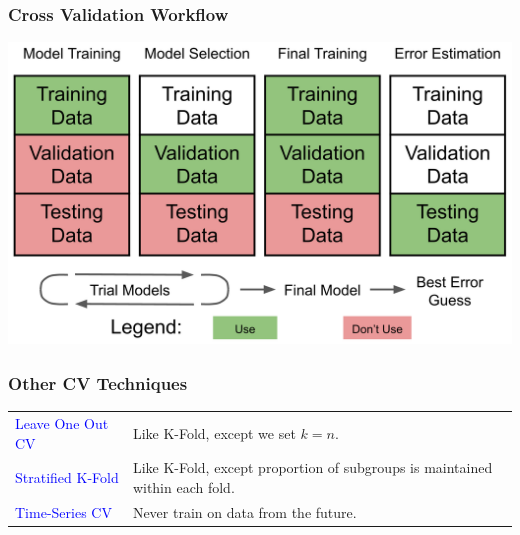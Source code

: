 \documentclass{beamer}
\begin{document}
\begin{frame}
  \frametitle{Cross Validation Workflow}
  \includegraphics[width=\textwidth]{images/cv_workflow.png}
\end{frame}

\begin{frame}
  \frametitle{Other CV Techniques}
  \begin{tabulary}{\textwidth}{LL}
    \textcolor{blue}{Leave One Out CV} & Like K-Fold, except we set $k=n$. \\ [2mm]
    \textcolor{blue}{Stratified K-Fold} & Like K-Fold, except proportion of subgroups is maintained within each fold. \\ [2mm]
    \textcolor{blue}{Time-Series CV} & Never train on data from the future. \\ [2mm]
  \end{tabulary}
\end{frame}
\end{document}
